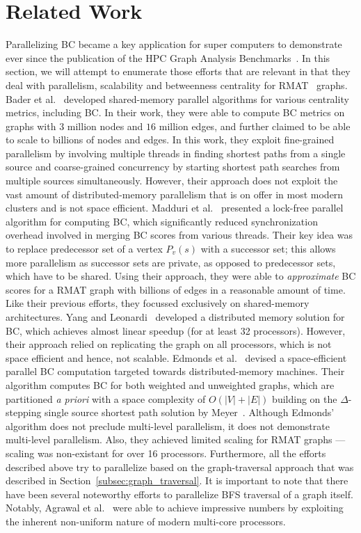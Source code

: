 \section{Related Work}
\label{sec:related}
%
Parallelizing BC became a key application for super computers to demonstrate
ever since the publication of the HPC Graph Analysis
Benchmarks~\cite{ssca_matlab}.
%
In this section, we will attempt to enumerate those efforts that are relevant
in that they deal with parallelism, scalability and betweenness centrality for
RMAT~\cite{Chakrabarti04:Recursive} graphs.
%
Bader et al.~\cite{Bader06:centrality} developed shared-memory parallel 
algorithms for various centrality metrics, including BC. 
%
In their work, they were able to compute BC metrics on graphs with $3$ million
nodes and $16$ million edges, and further claimed to be able to scale to
billions of nodes and edges.
%
In this work, they exploit fine-grained parallelism by involving multiple 
threads in finding shortest paths from a single source and coarse-grained
concurrency by starting shortest path searches from multiple sources 
simultaneously.
%
However, their approach does not exploit the vast amount of distributed-memory
parallelism that is on offer in most modern clusters and is not space
efficient.
%
Madduri et al.~\cite{Madduri:2009} presented a lock-free parallel algorithm for
computing BC, which significantly reduced synchronization overhead involved in
merging BC scores from various threads.
%
Their key idea was to replace predecessor set of a vertex $P_v(s)$ with a
successor set; this allows more parallelism as successor sets are private, as
opposed to predecessor sets, which have to be shared.
%
Using their approach, they were able to \textit{approximate} BC scores for a 
RMAT graph with billions of edges in a reasonable amount of time.
%
Like their previous efforts, they focussed exclusively on shared-memory
architectures.
%
Yang and Leonardi~\cite{Yang05} developed a distributed memory solution for 
BC, which achieves almost linear speedup (for at least 32 processors).
%
However, their approach relied on replicating the graph on all processors,
which is not space efficient and hence, not scalable.
%
Edmonds et al.~\cite{edmonds-hipc-2010} devised a space-efficient parallel 
BC computation targeted towards distributed-memory machines.
%
Their algorithm computes BC for both weighted and unweighted graphs, which are
partitioned \textit{a priori} with a space complexity of
$O(\lvert{}V\rvert{}+\lvert{}E\rvert{})$ building on the $\Delta{}$-stepping
single source shortest path solution by Meyer~\cite{Meyer03:DeltaStepping}.
%
Although Edmonds' algorithm does not preclude multi-level parallelism, it does 
not demonstrate multi-level parallelism.
%
Also, they achieved limited scaling for RMAT graphs --- scaling was
non-existant for over 16 processors.
%
Furthermore, all the efforts described above try to parallelize based on the
graph-traversal approach that was described in
Section~\ref{subsec:graph_traversal}.
%
It is important to note that there have been several noteworthy efforts to 
parallelize BFS traversal of a graph itself.
%
Notably, Agrawal et al.~\cite{virat_sc_2010} were able to achieve impressive 
numbers by exploiting the inherent non-uniform nature of modern multi-core 
processors.

